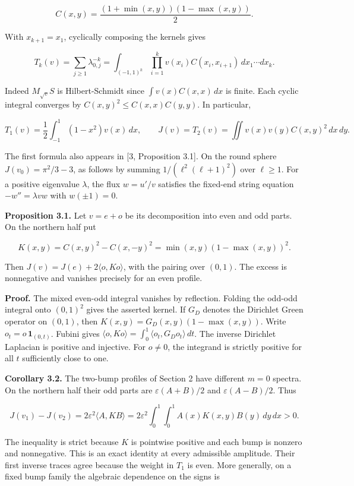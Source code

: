 \documentclass[11pt,letterpaper]{article}
\begin{document}
\[C(x,y)=\frac{(1+\min(x,y))(1-\max(x,y))}{2}.\]

With \(x_{k+1}=x_1\), cyclically composing the kernels gives

\[T_k(v)=\sum_{j\ge1}\lambda_{0,j}^{-k}=\int_{(-1,1)^k}\prod_{i=1}^k v(x_i)C(x_i,x_{i+1})\,dx_1\cdots dx_k.\]

Indeed \(M_{\sqrt v}S\) is Hilbert-Schmidt since \(\int v(x)C(x,x)\,dx\) is finite. Each
cyclic integral converges by \(C(x,y)^2\le C(x,x)C(y,y)\). In particular,

\[T_1(v)=\frac12\int_{-1}^{1}(1-x^2)v(x)\,dx,\qquad J(v)=T_2(v)=\iint v(x)v(y)C(x,y)^2\,dx\,dy.\]

The first formula also appears in [3, Proposition 3.1]. On the round sphere
\(J(v_0)=\pi^2/3-3\), as follows by summing \(1/(\ell^2(\ell+1)^2)\) over \(\ell\ge1\). For
a positive eigenvalue \(\lambda\), the flux \(w=u'/v\) satisfies the fixed-end string
equation \(-w''=\lambda v w\) with \(w(\pm1)=0\).

\textbf{Proposition 3.1.} Let \(v=e+o\) be its decomposition into even and odd parts. On the
northern half put

\[K(x,y)=C(x,y)^2-C(x,-y)^2=\min(x,y)(1-\max(x,y))^2.\]

Then \(J(v)=J(e)+2\langle o,Ko\rangle\), with the pairing over \((0,1)\). The excess is
nonnegative and vanishes precisely for an even profile.

\textbf{Proof.} The mixed even-odd integral vanishes by reflection. Folding the odd-odd
integral onto \((0,1)^2\) gives the asserted kernel. If \(G_D\) denotes the Dirichlet Green
operator on \((0,1)\), then \(K(x,y)=G_D(x,y)(1-\max(x,y))\). Write
\(o_t=o\,\mathbf 1_{(0,t)}\). Fubini gives
\(\langle o,Ko\rangle=\int_0^1\langle o_t,G_D o_t\rangle\,dt\). The inverse Dirichlet
Laplacian is positive and injective. For \(o\ne0\), the integrand is strictly positive for
all \(t\) sufficiently close to one.

\textbf{Corollary 3.2.} The two-bump profiles of Section 2 have different \(m=0\) spectra.
On the northern half their odd parts are \(\varepsilon(A+B)/2\) and \(\varepsilon(A-B)/2\).
Thus

\[J(v_1)-J(v_2)=2\varepsilon^2\langle A,KB\rangle=2\varepsilon^2\int_0^1\int_0^1 A(x)K(x,y)B(y)\,dy\,dx>0.\]

The inequality is strict because \(K\) is pointwise positive and each bump is nonzero and
nonnegative. This is an exact identity at every admissible amplitude. Their first inverse
traces agree because the weight in \(T_1\) is even. More generally, on a fixed bump family
the algebraic dependence on the signs is
\end{document}
